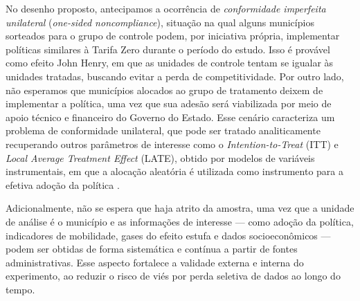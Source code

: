 No desenho proposto, antecipamos a ocorrência de \textit{conformidade imperfeita unilateral} (\textit{one-sided noncompliance}), situação na qual alguns municípios sorteados para o grupo de controle podem, por iniciativa própria, implementar políticas similares à Tarifa Zero durante o período do estudo. Isso é provável como efeito John Henry, em que as unidades de controle tentam se igualar às unidades tratadas, buscando evitar a perda de competitividade. Por outro lado, não esperamos que municípios alocados ao grupo de tratamento deixem de implementar a política, uma vez que sua adesão será viabilizada por meio de apoio técnico e financeiro do Governo do Estado. Esse cenário caracteriza um problema de conformidade unilateral, que pode ser tratado analiticamente recuperando outros parâmetros de interesse como o \textit{Intention-to-Treat} (ITT) e \textit{Local Average Treatment Effect} (LATE), obtido por modelos de variáveis instrumentais, em que a alocação aleatória é utilizada como instrumento para a efetiva adoção da política \cite{duflo2008toolkit, angrist2009mostly}.

Adicionalmente, não se espera que haja atrito da amostra, uma vez que a unidade de análise é o município e as informações de interesse — como adoção da política, indicadores de mobilidade, gases do efeito estufa e dados socioeconômicos — podem ser obtidas de forma sistemática e contínua a partir de fontes administrativas. Esse aspecto fortalece a validade externa e interna do experimento, ao reduzir o risco de viés por perda seletiva de dados ao longo do tempo.



